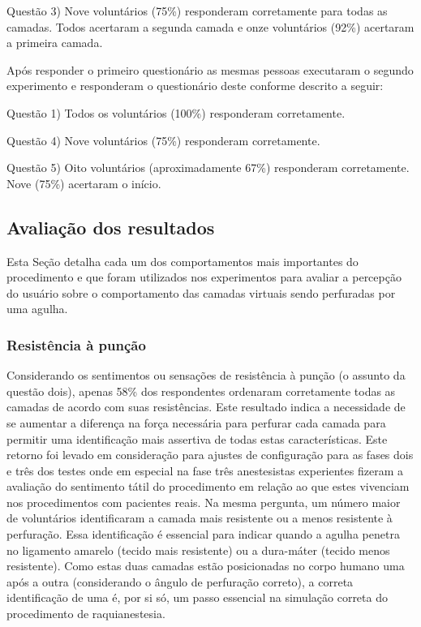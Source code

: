 Questão 3) Nove voluntários (75\%) responderam corretamente para todas as camadas. Todos acertaram a segunda camada e onze voluntários (92\%) acertaram a primeira camada. 

Após responder o primeiro questionário as mesmas pessoas executaram o segundo experimento e responderam o questionário deste conforme descrito a seguir:

Questão 1) Todos os voluntários (100\%) responderam corretamente.

Questão 4) Nove voluntários (75\%) responderam corretamente.

Questão 5) Oito voluntários (aproximadamente 67\%) responderam corretamente. Nove (75\%) acertaram o início.

\subsection{Avaliação dos resultados}
\label{sec:avaliacao}

Esta Seção detalha cada um dos comportamentos mais importantes do procedimento e que foram utilizados nos experimentos para avaliar a percepção do usuário sobre o comportamento das camadas virtuais sendo perfuradas por uma agulha.

\subsubsection{Resistência à punção}

Considerando os sentimentos ou sensações de resistência à punção (o assunto da questão dois), apenas 58\% dos respondentes ordenaram corretamente todas as camadas de acordo com suas resistências. Este resultado indica a necessidade de se aumentar a diferença na força necessária para perfurar cada camada para permitir uma identificação mais assertiva de todas estas características. Este retorno foi levado em consideração para ajustes de configuração para as fases dois e três dos testes onde em especial na fase três anestesistas experientes fizeram a avaliação do sentimento tátil do procedimento em relação ao que estes vivenciam nos procedimentos com pacientes reais. Na mesma pergunta, um número maior de voluntários identificaram a camada mais resistente ou a menos resistente à perfuração. Essa identificação é essencial para indicar quando a agulha penetra no ligamento amarelo (tecido mais resistente) ou a dura-máter (tecido menos resistente). Como estas duas camadas estão posicionadas no corpo humano uma após a outra (considerando o ângulo de perfuração correto), a correta identificação de uma é, por si só, um passo essencial na simulação correta do procedimento de raquianestesia.

